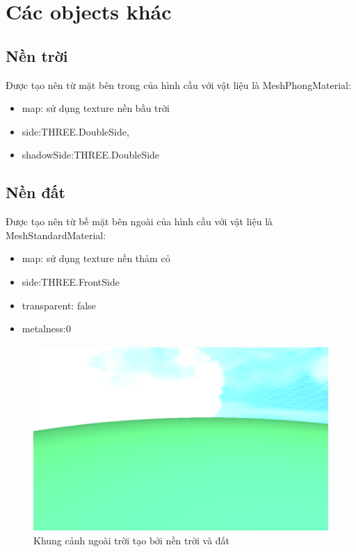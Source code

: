 \section{Các objects khác}
\subsection{Nền trời}
Được tạo nên từ mặt bên trong của hình cầu với vật liệu là MeshPhongMaterial:
\begin{itemize}
    \item map: sử dụng texture nền bầu trời
    \item side:THREE.DoubleSide,
    \item shadowSide:THREE.DoubleSide 
\end{itemize}

\subsection{Nền đất}
Được tạo nên từ bề mặt bên ngoài của hình cầu với vật liệu là MeshStandardMaterial:
\begin{itemize}
    \item map: sử dụng texture nền thảm cỏ
    \item side:THREE.FrontSide
    \item transparent: false
    \item metalness:0
\end{itemize}

\begin{center}
    \begin{figure}[!h]
        \centering
        \includegraphics[scale = 1]{contents/day.png}
        \caption{Khung cảnh ngoài trời tạo bởi nền trời và đất}
    \end{figure}
\end{center}

